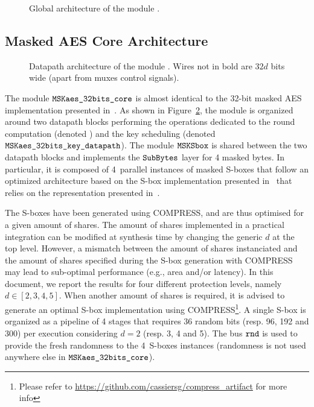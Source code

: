 \documentclass{scrartcl}
\begin{document}
\begin{figure}
    \centering
    \resizebox{\textwidth}{!}{
        \begin{tikzpicture}
            
        \end{tikzpicture}
    }
    \caption{Global architecture of the module \topName.}
    \label{fig:top_module_view}
\end{figure}

\subsection{Masked AES Core Architecture} 
\label{section:masked_aes_core_arhcitecture}

\begin{figure}
    \centering
    \resizebox{\textwidth}{!}{
        \begin{tikzpicture}
            
        \end{tikzpicture}
    }
    \caption{Datapath architecture of the module \topModAES. Wires not in bold are $32d$ bits wide (apart from muxes control signals).}
    \label{fig:aes_glob_arch}
\end{figure}

The module $\texttt{MSKaes\_32bits\_core}$ is almost identical to the 32-bit masked AES
implementation presented in~\cite{DBLP:conf/cosade/MominCS22}. As shown in
Figure~\ref{fig:aes_glob_arch}, the module is organized around two datapath
blocks performing the operations dedicated to the round computation (denoted
\modAESdpState) and the key scheduling (denoted $\texttt{MSKaes\_32bits\_key\_datapath}$). The module
$\texttt{MSKSbox}$ is shared between the two datapath blocks and implements the
$\texttt{SubBytes}$ layer for 4 masked bytes. In particular, it is composed of 4~parallel
instances of masked S-boxes that follow an optimized architecture based on the
S-box implementation presented in~\cite{DBLP:journals/tches/CassiersGMMN24}
that relies on the representation presented in~\cite{DBLP:conf/ches/Canright05}.

The S-boxes have been generated using COMPRESS, and are thus optimised for a
given amount of shares. The amount of shares implemented in a practical
integration can be modified at synthesis time by changing the generic $d$ at
the top level. However, a mismatch between the amount of shares instanciated
and the amount of shares specified during the S-box generation with COMPRESS
may lead to sub-optimal performance (e.g., area and/or latency). In this
document, we report the results for four different protection levels, namely
$d\in[2,3,4,5]$. When another amount of shares is required, it is advised to
generate an optimal S-box implementation using COMPRESS\footnote{Please refer
    to
    \href{https://github.com/cassiersg/compress_artifact}{https://github.com/cassiersg/compress\_artifact}
for more info}.  A single S-box is organized as a pipeline of 4 stages that
requires 36 random bits (resp. 96, 192 and 300) per execution considering $d=2$
(resp. 3, 4 and 5). The bus $\texttt{rnd}$ is used to provide the fresh
randomness to the 4~S-boxes instances (randomness is not used anywhere else in
$\texttt{MSKaes\_32bits\_core}$).
\end{document}
